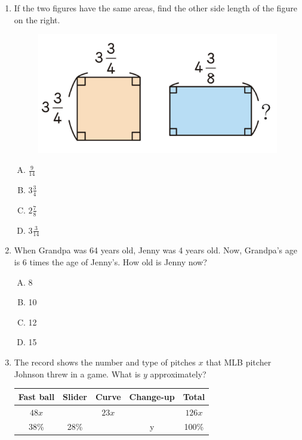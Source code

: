 \documentclass[12pt]{scrartcl}
\begin{document}
\begin{enumerate}
\item If the two figures have the same areas, find the other side length of the figure on the right.
\begin{figure}[h]
    \centering
    \includegraphics{StarGen/0Figure/wmi-2020-6a-two-rectangle.png}
\end{figure}
\begin{enumerate}[(A)]
    \item $\frac{9}{14}$ \item $3\frac{3}{4}$ \item $2\frac{7}{8}$ \item $3\frac{3}{14}$
\end{enumerate}

\item When Grandpa was 64 years old, Jenny was 4 years old. Now, Grandpa's age is 6 times the age of Jenny's. How old is Jenny now?
\begin{enumerate}[(A)]
    \item 8 \item 10 \item 12 \item 15
\end{enumerate}

\item The record shows the number and type of pitches $x$ that MLB pitcher Johnson threw in a game. What is $y$ approximately?
\begin{center}
    \begin{tabular}{|c|c|c|c|c|}
    \hline
    Fast ball & Slider & Curve & Change-up & Total\\
    \hline
    $48x$ & & $23x$ & & $126x$\\
    \hline
    38\% & 28\% & & y & 100\%\\
    \hline
    \end{tabular}
\end{center}


\end{enumerate}
\end{document}
